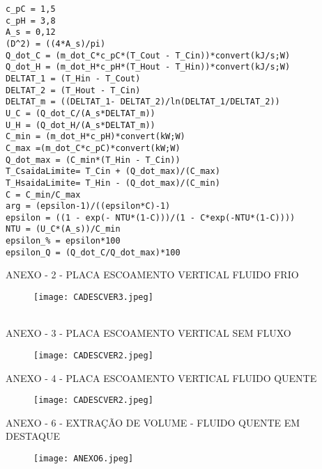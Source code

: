 \documentclass[a4paper,12pt,oneside]{article}
\begin{document}
\begin{flushright}

\begin{lstlisting}
c_pC = 1,5
c_pH = 3,8
A_s = 0,12
(D^2) = ((4*A_s)/pi)
Q_dot_C = (m_dot_C*c_pC*(T_Cout - T_Cin))*convert(kJ/s;W)
Q_dot_H = (m_dot_H*c_pH*(T_Hout - T_Hin))*convert(kJ/s;W)
DELTAT_1 = (T_Hin - T_Cout)
DELTAT_2 = (T_Hout - T_Cin)
DELTAT_m = ((DELTAT_1- DELTAT_2)/ln(DELTAT_1/DELTAT_2))
U_C = (Q_dot_C/(A_s*DELTAT_m))
U_H = (Q_dot_H/(A_s*DELTAT_m))
C_min = (m_dot_H*c_pH)*convert(kW;W)
C_max =(m_dot_C*c_pC)*convert(kW;W)
Q_dot_max = (C_min*(T_Hin - T_Cin))
T_CsaidaLimite= T_Cin + (Q_dot_max)/(C_max)
T_HsaidaLimite= T_Hin - (Q_dot_max)/(C_min)
C = C_min/C_max
arg = (epsilon-1)/((epsilon*C)-1)
epsilon = ((1 - exp(- NTU*(1-C)))/(1 - C*exp(-NTU*(1-C))))
NTU = (U_C*(A_s))/C_min
epsilon_% = epsilon*100
epsilon_Q = (Q_dot_C/Q_dot_max)*100
\end{lstlisting}
\vspace{0.5cm}

\pagebreak
\clearpage
\newpage
\large ANEXO - 2 - PLACA ESCOAMENTO VERTICAL FLUIDO FRIO
\vspace{0.5cm}
\begin{figure}[h]
	\centering
\texttt{[image: CADESCVER3.jpeg]}
\end{figure}\\
\large ANEXO - 3 - PLACA ESCOAMENTO VERTICAL SEM FLUXO
\vspace{0.5cm}
\begin{figure}[h]
	\centering
	\texttt{[image: CADESCVER2.jpeg]}
\end{figure}
\pagebreak
\clearpage
\newpage
\large ANEXO - 4 - PLACA ESCOAMENTO VERTICAL FLUIDO QUENTE
\vspace{0.5cm}
\begin{figure}[h]
	\centering
	\texttt{[image: CADESCVER2.jpeg]}
\end{figure}
\pagebreak
\clearpage
\newpage
\large ANEXO - 6 - EXTRAÇÃO DE VOLUME - FLUIDO QUENTE EM DESTAQUE
\vspace{0.5cm}
\begin{figure}[h]
	\centering
	\texttt{[image: ANEXO6.jpeg]}
\end{figure}
\pagebreak
\clearpage
\newpage
\end{flushright}	
\end{document}
